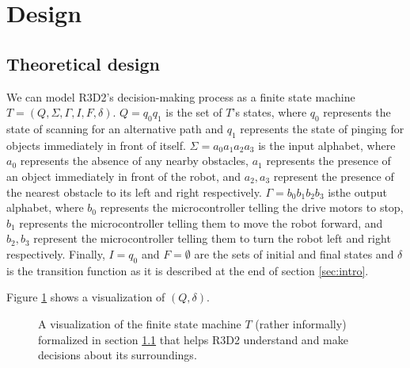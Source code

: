 \documentclass{article}
\begin{document}
\section{Design}

\subsection{Theoretical design} \label{sec:fsm}

We can model R3D2's decision-making process as a finite state machine
$T = (Q,\Sigma,\Gamma,I,F,\delta)$. $Q = q_0q_1$ is the set of $T$'s states,
where $q_0$ represents the state of scanning for an alternative path and $q_1$
represents the state of pinging for objects immediately in front of itself.
$\Sigma = a_0a_1a_2a_3$ is the input alphabet, where $a_0$ represents the
absence of any nearby obstacles, $a_1$ represents the presence of an object
immediately in front of the robot, and $a_2,a_3$ represent the presence of the
nearest obstacle to its left and right respectively. $\Gamma = b_0b_1b_2b_3$ isthe output alphabet, where $b_0$ represents the microcontroller telling the
drive motors to stop, $b_1$ represents the microcontroller telling them to move
the robot forward, and $b_2,b_3$ represent the microcontroller telling them to
turn the robot left and right respectively. Finally, $I = q_0$ and
$F = \emptyset$ are the sets of initial and final states and $\delta$ is the
transition function as it is described at the end of section \ref{sec:intro}.

Figure \ref{fig:fsm} shows a visualization of $(Q,\delta)$.

\begin{figure}[h]
  \centering
  \caption{A visualization of the finite state machine $T$ (rather informally)
    formalized in section \ref{sec:fsm} that helps R3D2 understand and make
    decisions about its surroundings.}
  \label{fig:fsm}
\end{figure}
\end{document}
